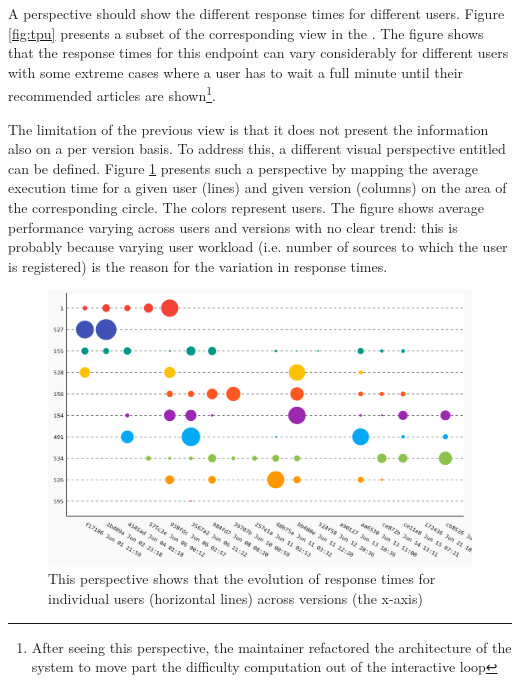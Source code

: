 \documentclass{sig-alternate-05-2015}
\begin{document}
A  perspective should show the different response times for different users. Figure \ref{fig:tpu} presents a subset of the corresponding view in the \tool. The figure shows that the response times for this endpoint can vary considerably for different users with some extreme cases where a user has to wait a full minute until their recommended articles are shown\footnote{After seeing this perspective, the maintainer refactored the architecture of the system to move part the difficulty computation out of the interactive loop}.



The limitation of the previous view is that it does not present the information also on a per version basis. To address this, a different visual perspective entitled  can be defined. Figure \ref{fig:tuv} presents such a perspective by mapping the average execution time for a given user (lines) and given version (columns) on the area of the corresponding circle. The colors represent users. The figure shows average performance varying  across users and versions with no clear trend: this is probably because varying user workload (i.e. number of sources to which the user is registered) is the reason for the variation in response times.

\begin{figure}[!ht]
	\centering
	\includegraphics[width=0.9\linewidth]{time_per_user_per_version}
	\caption{This perspective shows that the evolution of response times for individual users (horizontal lines) across versions (the x-axis)}
	\label{fig:tuv}
\end{figure}
\end{document}
